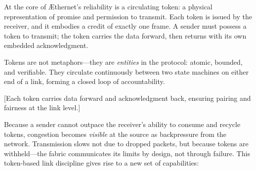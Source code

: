 \documentclass[../../../OAE-SPEC-MAIN.tex]{subfiles}
\begin{document}
At the core of \AE thernet’s reliability is a circulating token: a physical representation of promise and permission to transmit. Each token is issued by the receiver, and it embodies a credit of exactly one frame. A sender must possess a token to transmit; the token carries the data forward, then returns with its own embedded acknowledgment.

Tokens are not metaphors—they are \emph{entities} in the protocol: atomic, bounded, and verifiable. They circulate continuously between two state machines on either end of a link, forming a closed loop of accountability.

[Each token carries data forward and acknowledgment back, ensuring pairing and fairness at the link level.]

Because a sender cannot outpace the receiver’s ability to consume and recycle tokens, congestion becomes \emph{visible} at the source as backpressure from the network. Transmission slows not due to dropped packets, but because tokens are withheld—the fabric communicates its limits by design, not through failure. This token-based link discipline gives rise to a new set of capabilities:
\end{document}
